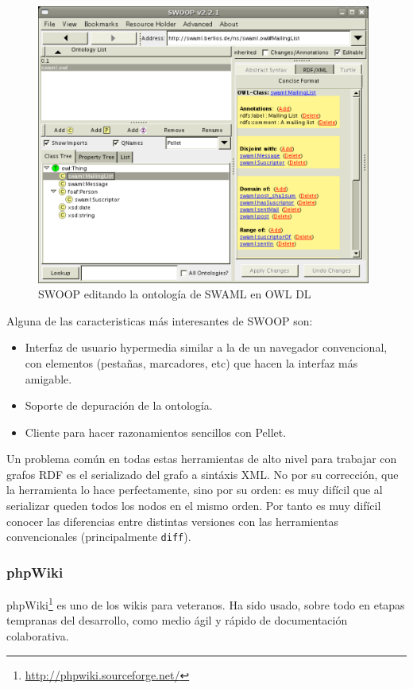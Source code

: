 \begin{figure}[ht]
	\centering
	\includegraphics[width=11cm]{images/screenshots/swoop.png}
	\caption{SWOOP editando la ontología de SWAML en OWL DL}
	\label{fig:evoWeb}
\end{figure}

Alguna de las caracteristicas más interesantes de SWOOP son:

\begin{itemize}
  \item Interfaz de usuario hypermedia similar a la de un navegador convencional, 
	con elementos (pestañas, marcadores, etc) que hacen la interfaz más 
	amigable.
  \item Soporte de depuración de la ontología.
  \item Cliente para hacer razonamientos sencillos con Pellet.
\end{itemize}

Un problema común en todas estas herramientas de alto nivel para trabajar con
grafos RDF es el serializado del grafo a sintáxis XML. No por su corrección,
que la herramienta lo hace perfectamente, sino por su orden: es muy difícil
que al serializar queden todos los nodos en el mismo orden. Por tanto es muy
difícil conocer las diferencias entre distintas versiones con las herramientas
convencionales (principalmente \texttt{diff}).

\subsubsection{phpWiki}

phpWiki\footnote{\url{http://phpwiki.sourceforge.net/}} es uno de los wikis
para veteranos. Ha sido usado, sobre todo en etapas tempranas del desarrollo, 
como medio ágil y rápido de documentación colaborativa.

